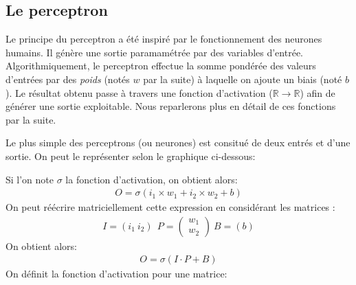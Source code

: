 \documentclass[12pt]{article}
\begin{document}
\subsection{Le perceptron}\label{subsection: \thesubsection}
Le principe du perceptron a été inspiré par le fonctionnement des neurones humains. Il génère une sortie paramamétrée par des variables d'entrée. Algorithmiquement, le perceptron effectue la somme pondérée des valeurs d'entrées par des \textit{poids} (notés $w$ par la suite) à laquelle on ajoute un biais (noté $b$).
Le résultat obtenu passe à travers une fonction d'activation ($\mathds{R} \rightarrow \mathds{R}$) afin de générer une sortie exploitable. Nous reparlerons plus en détail de ces fonctions par la suite.

Le plus simple des perceptrons (ou neurones) est consitué de deux entrés et d'une sortie. On peut le représenter selon le graphique ci-dessous:
\begin{center}
\end{center}
Si l'on note $\sigma$ la fonction d'activation, on obtient alors:
\begin{align}
O = \sigma ( i_1 \times w_1  + i_2 \times w_2 + b )
\end{align}
On peut réécrire matriciellement cette expression en considérant les matrices :
\begin{align*}
I = (i_1 \ i_2) \ \  P = \begin{pmatrix}{w_1}\\{w_2}\end{pmatrix}  \ B = (b)
\end{align*}
On obtient alors:
\begin{align}
O = \sigma \left( I \cdot P + B \right)
\end{align}
On définit la fonction d'activation pour une matrice:
\end{document}
